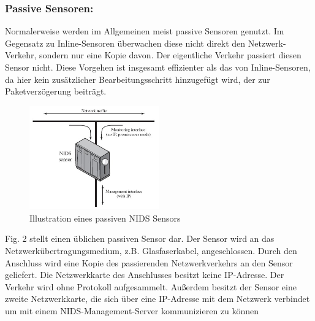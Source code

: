 \subsubsection{Passive Sensoren:}
Normalerweise werden im Allgemeinen meist passive Sensoren genutzt. Im Gegensatz zu Inline-Sensoren überwachen diese nicht direkt den Netzwerk-Verkehr, sondern nur eine Kopie davon. Der eigentliche Verkehr passiert diesen Sensor nicht. Diese Vorgehen ist insgesamt effizienter als das von Inline-Sensoren, da hier kein zusätzlicher Bearbeitungsschritt hinzugefügt wird, der zur Paketverzögerung beiträgt.\cite{url_sensors}\cite{IDS_Book_2}
\begin{figure}
\center
\includegraphics[width=0.5\textwidth]{img/passive_sensor.jpg}
\caption{Illustration eines passiven NIDS Sensors \cite{IDS_Book_2}} \label{fig1}
\end{figure}

Fig. 2 stellt einen üblichen passiven Sensor dar. Der Sensor wird an das Netzwerkübertragungsmedium, z.B. Glasfaserkabel, angeschlossen. Durch den Anschluss wird eine Kopie des passierenden Netzwerkverkehrs an den Sensor geliefert. Die Netzwerkkarte des Anschlusses besitzt keine IP-Adresse. Der Verkehr wird ohne Protokoll aufgesammelt. Außerdem besitzt der Sensor eine zweite Netzwerkkarte, die sich über eine IP-Adresse mit dem Netzwerk verbindet um mit einem NIDS-Management-Server kommunizieren zu können \cite{IDS_Book_2}